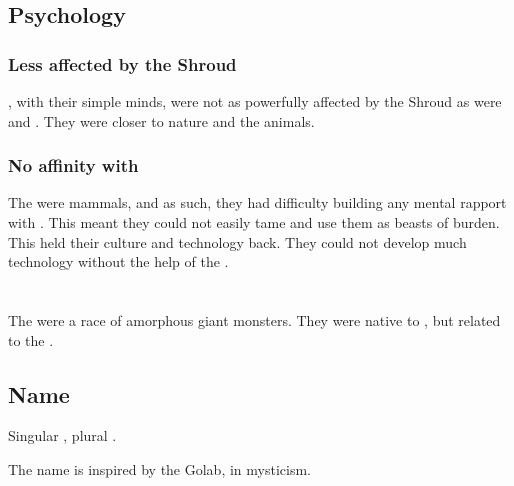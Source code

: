 \subsection{Psychology}





\subsubsection{Less affected by the Shroud}
\Nephilim, with their simple minds, were not as powerfully affected by the Shroud as were \scathae and \humans.
They were closer to nature and the animals. 





\subsubsection{No affinity with \saurians}
The \nephilim were mammals, and as such, they had difficulty building any mental rapport with \saurians.
This meant they could not easily tame \saurians and use them as beasts of burden.
This held their culture and technology back.
They could not develop much technology without the help of the \ophidians. 















\section{\Noggyal}
\index{\noggyal}
The \noggyaleth{} were a race of amorphous giant monsters. 
They were native to \Miith, but related to the \banes. 









\subsection{Name}
Singular \emph{\noggyal{}}, plural \emph{\noggyaleth{}}. 

The name is inspired by the \Qliphah{} Golab, in \Cabbalah mysticism.









